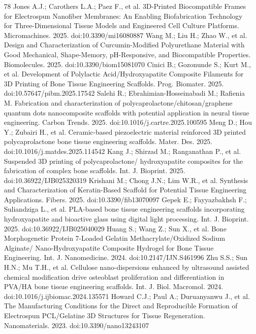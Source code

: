 \documentclass[5p,times,twocolumn]{elsarticle}
\begin{document}
\begin{thebibliography}{78}
 Jones A.J.; Carothers L.A.; Paez F., et al. 3D-Printed Biocompatible Frames for Electrospun Nanofiber Membranes: An Enabling Biofabrication Technology for Three-Dimensional Tissue Models and Engineered Cell Culture Platforms. Micromachines. 2025. doi:10.3390/mi16080887
 Wang M.; Liu H.; Zhao W., et al. Design and Characterization of Curcumin-Modified Polyurethane Material with Good Mechanical, Shape-Memory, pH-Responsive, and Biocompatible Properties. Biomolecules. 2025. doi:10.3390/biom15081070
 Cinici B.; Gozonunde S.; Kurt M., et al. Development of Polylactic Acid/Hydroxyapatite Composite Filaments for 3D Printing of Bone Tissue Engineering Scaffolds. Prog. Biomater. 2025. doi:10.57647/pibm.2025.17542
 Salehi R.; Ebrahimian-Hosseinabadi M.; Rafienia M. Fabrication and characterization of polycaprolactone/chitosan/graphene quantum dots nanocomposite scaffolds with potential application in neural tissue engineering. Carbon Trends. 2025. doi:10.1016/j.cartre.2025.100595
 Meng D.; Hou Y.; Zubairi H., et al. Ceramic-based piezoelectric material reinforced 3D printed polycaprolactone bone tissue engineering scaffolds. Mater. Des. 2025. doi:10.1016/j.matdes.2025.114542
 Kang J.; Shirzad M.; Ranganathan P., et al. Suspended 3D printing of polycaprolactone/ hydroxyapatite composites for the fabrication of complex bone scaffolds. Int. J. Bioprint. 2025. doi:10.36922/IJB025320319
 Krishani M.; Chong J.N.; Lim W.R., et al. Synthesis and Characterization of Keratin-Based Scaffold for Potential Tissue Engineering Applications. Fibers. 2025. doi:10.3390/fib13070097
 Gepek E.; Fayyazbakhsh F.; Suliandziga L., et al. PLA-based bone tissue engineering scaffolds incorporating hydroxyapatite and bioactive glass using digital light processing. Int. J. Bioprint. 2025. doi:10.36922/IJB025040029
 Huang S.; Wang Z.; Sun X., et al. Bone Morphogenetic Protein 7-Loaded Gelatin Methacrylate/Oxidized Sodium Alginate/ Nano-Hydroxyapatite Composite Hydrogel for Bone Tissue Engineering. Int. J. Nanomedicine. 2024. doi:10.2147/IJN.S461996
 Zhu S.S.; Sun H.N.; Mu T.H., et al. Cellulose nano-dispersions enhanced by ultrasound assisted chemical modification drive osteoblast proliferation and differentiation in PVA/HA bone tissue engineering scaffolds. Int. J. Biol. Macromol. 2024. doi:10.1016/j.ijbiomac.2024.135571
 Howard C.J.; Paul A.; Duruanyanwu J., et al. The Manufacturing Conditions for the Direct and Reproducible Formation of Electrospun PCL/Gelatine 3D Structures for Tissue Regeneration. Nanomaterials. 2023. doi:10.3390/nano13243107

\end{thebibliography}
\end{document}
